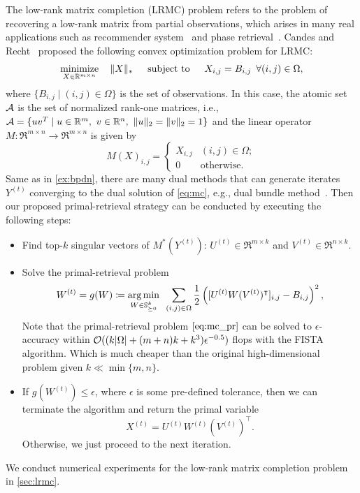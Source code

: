 \begin{example} \label{ex:mc}
The low-rank matrix completion (LRMC) problem refers to the problem of recovering a low-rank matrix from partial observations, which arises in many real applications such as recommender system~\cite{rennie2005fast} and phase retrieval~\cite{candes2013phaselift}. Candes and Recht~\cite{canr:2009} proposed the following convex optimization problem for LRMC:
\begin{equation} \label{eq:mc}
\displaystyle\mathop{\hbox{\rm minimize}}_{X\in\mathbb{R}^{m\times n}}\enspace\enspace \|X\|_*  \enspace\hbox{\quad subject to\quad}\enspace X_{i,j} = B_{i,j} \enspace\forall (i,j) \in \Omega,
\end{equation}
where $\{B_{i,j} \mid (i,j) \in \Omega\}$ is the set of observations. In this case, the atomic set $\mathcal{A}$ is the set of normalized rank-one matrices, i.e., $\mathcal{A} = \{uv^T \mid u \in \mathbb{R}^m,\ v \in \mathbb{R}^n,\ \|u\|_2=\|v\|_2 = 1\}$ and the linear operator $M:\Re^{m\times n} \to \Re^{m\times n}$ is given by 
\[ M(X)_{i,j} = 
\begin{cases}
    X_{i,j} &(i,j) \in \Omega; \\
    0 &\mathrm{otherwise}.
\end{cases}
\]
Same as in \autoref{ex:bpdn}, there are many dual methods that can generate iterates $Y^{(t)}$ converging to the dual solution of \eqref{eq:mc}, e.g., dual bundle method~\cite{fan2019bundle}. Then our proposed primal-retrieval strategy can be conducted by executing the following steps:
\begin{itemize}
    \item Find top-$k$ singular vectors of $M^*(Y^{(t)})$: $U^{(t)} \in \Re^{m \times k}$ and $V^{(t)} \in \Re^{n \times k}$.  
    \item Solve the primal-retrieval problem
    \begin{equation} \label{eq:mc_pr}
        W^{(t)} = g(W) \coloneqq \underset{W \in \mathbb{S}^k_{\succeq 0}}{\textrm{arg}\,{\min}}\enskip \sum_{(i,j) \in \Omega}  \frac{1}{2}\left([U^{(t)}W(V^{(t)})^\intercal]_{i,j} - B_{i,j}\right)^2, 
    \end{equation}
    Note that the primal-retrieval problem $\eqref{eq:mc_pr}$ can be solved to $\epsilon$-accuracy within $\mathcal{O}(( k |\Omega| + (m+n)k + k^3 )\epsilon^{-0.5})$ flops with the FISTA \cite{beck2009fast} algorithm. Which is much cheaper than the original high-dimensional problem given $k \ll \min\{m,n\}$. 
    \item If $g(W^{(t)}) \leq \epsilon$, where $\epsilon$ is some pre-defined tolerance, then we can terminate the algorithm and return the primal variable 
    \[X^{(t)} = U^{(t)}W^{(t)}(V^{(t)})^\intercal.\]
    Otherwise, we just proceed to the next iteration. 
\end{itemize}
We conduct numerical experiments for the low-rank matrix completion problem in \autoref{sec:lrmc}. 
\end{example}

